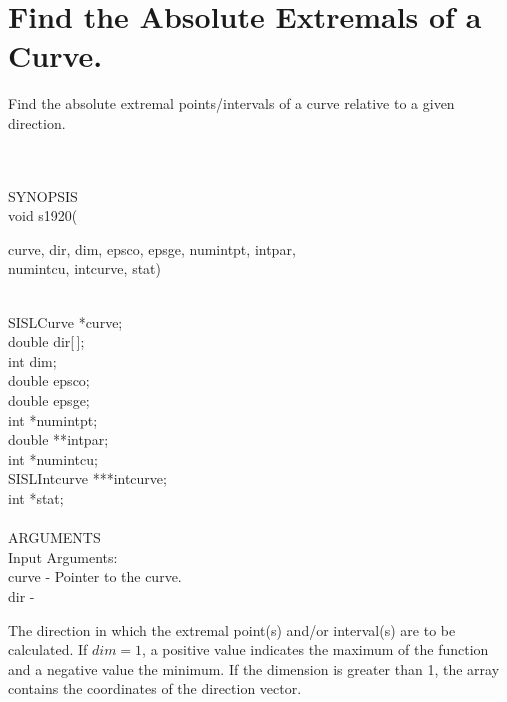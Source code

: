 \section{Find the Absolute Extremals of a Curve.}
\begin{minipg1}
  Find the absolute extremal points/intervals of a curve relative to a
  given direction.
\end{minipg1} \\ \\
SYNOPSIS\\
        \>void s1920(\begin{minipg3}
        {\fov curve}, {\fov dir}, {\fov dim}, {\fov epsco}, {\fov epsge}, {\fov numintpt},
        {\fov intpar},\\ {\fov numintcu}, {\fov intcurve}, {\fov stat})
                \end{minipg3}\\[0.3ex]
                \>\>    SISLCurve       \>      *{\fov curve};\\
                \>\>    double  \>      {\fov dir}[\,];\\
                \>\>    int     \>      {\fov dim};\\
                \>\>    double  \>      {\fov epsco};\\
                \>\>    double  \>      {\fov epsge};\\
                \>\>    int     \>      *{\fov numintpt};\\
                \>\>    double  \>      **{\fov intpar};\\
                \>\>    int     \>      *{\fov numintcu};\\
                \>\>    SISLIntcurve \> ***{\fov intcurve};\\
                \>\>    int     \>      *{\fov stat};\\
\\
ARGUMENTS\\
        \>Input Arguments:\\
        \>\>    {\fov curve}    \> - \> Pointer to the curve.\\
        \>\>    {\fov dir}      \> - \> \begin{minipg2}
                                The direction in which the extremal point(s)
                                and/or interval(s) are to be
                                calculated. If $dim=1$, a positive value
                                indicates the maximum of the
                                function and a negative value the minimum.
                                If the dimension is greater than 1, the array
                                contains the coordinates of the direction vector.
                                \end{minipg2}\\[0.8ex]
